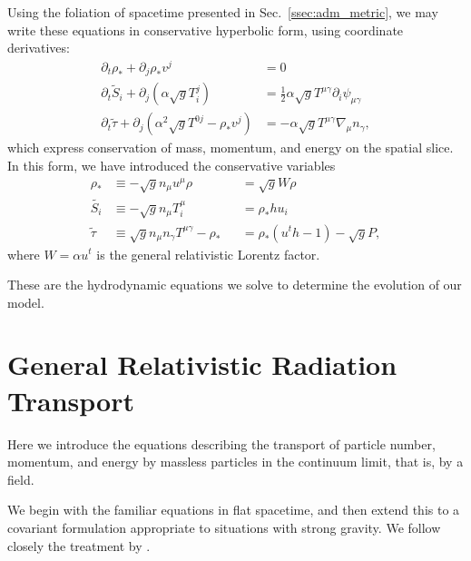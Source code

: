 Using the foliation of spacetime presented in Sec.~\ref{ssec:adm_metric}, we may
write these equations in conservative hyperbolic form,
using coordinate derivatives:
\begin{align}
  \label{eqn:adm_hydro_mass}
  \partial_t \rho_* + \partial_j \rho_* v^j &= 0 \\
  \label{eqn:adm_hydro_mom}
  \partial_t \tilde{S}_i + \partial_j(\alpha\sqrt{g}T^j_i) &=
  \frac{1}{2}\alpha\sqrt{g}T^{\mu\gamma}\partial_i\psi_{\mu\gamma} \\
  \label{eqn:adm_hydro_ener}
  \partial_t \tilde{\tau} + \partial_j(\alpha^2\sqrt{g}T^{0j}-\rho_*v^j) &=
  -\alpha\sqrt{g}T^{\mu\gamma}\nabla_\mu n_\gamma,
\end{align}
which express conservation of mass, momentum, and energy on the spatial slice.
In this form, we have introduced the conservative variables
\begin{align}
  \label{eqn:rhostar}
  \rho_*       &\equiv -\sqrt{g} n_\mu u^\mu \rho &&= \sqrt{g}W\rho \\
  \label{eqn:tildeS}
  \tilde{S_i}  &\equiv -\sqrt{g} n_\mu T^\mu_i    &&= \rho_* h u_i \\
  \label{eqn:tildetau}
  \tilde{\tau} &\equiv  \sqrt{g} n_\mu n_\gamma T^{\mu\gamma} - \rho_*
  &&= \rho_*(u^t h-1)-\sqrt{g}P,
\end{align}
where $W=\alpha u^t$ is the general relativistic Lorentz factor.

These are the hydrodynamic equations we solve to determine the evolution of
our model.

\section{General Relativistic Radiation Transport}
\label{sec:rad_transport}
Here we introduce the equations describing the transport of particle number,
momentum, and energy by massless particles in the continuum limit, that is,
by a field.

We begin with the familiar equations in flat spacetime, and then extend this
to a covariant formulation appropriate to situations with strong gravity.
We follow closely the treatment by \citet{miha1999-foundations}.

